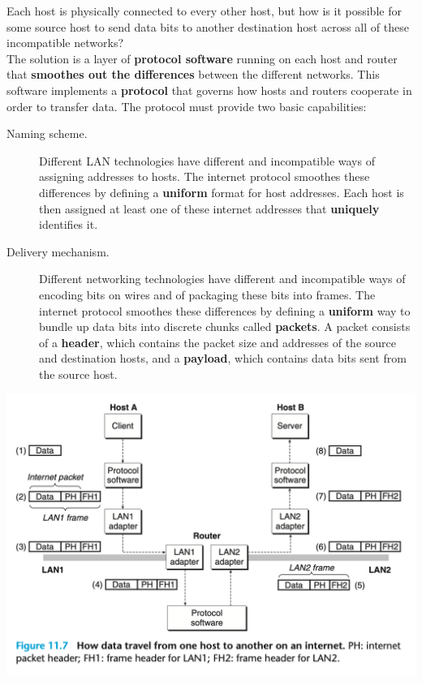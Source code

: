 \documentclass[11pt]{article}
\begin{document}
Each host is physically connected to every other host, but how is it possible for some source host to send data bits to another destination host across all of these incompatible networks?\\
The solution is a layer of \textbf{protocol software} running on each host and router that \textbf{smoothes out the differences} between the different networks. This software implements a \textbf{protocol} that governs how hosts and routers cooperate in order to transfer data. The protocol must provide two basic capabilities:\\
\begin{description}
\item[{Naming scheme.}] Different LAN technologies have different and incompatible ways of assigning addresses to hosts. The internet protocol smoothes these differences by defining a \textbf{uniform} format for host addresses. Each host is then assigned at least one of these internet addresses that \textbf{uniquely} identifies it.\\
\item[{Delivery mechanism.}] Different networking technologies have different and incompatible ways of encoding bits on wires and of packaging these bits into frames. The internet protocol smoothes these differences by defining a \textbf{uniform} way to bundle up data bits into discrete chunks called \textbf{packets}. A packet consists of a \textbf{header}, which contains the packet size and addresses of the source and destination hosts, and a \textbf{payload}, which contains data bits sent from the source host.\\
\end{description}



\begin{center}
\includegraphics[width=.9\linewidth]{pics/figure11.7-data-traval-on-internet.png}
\end{center}
\end{document}
